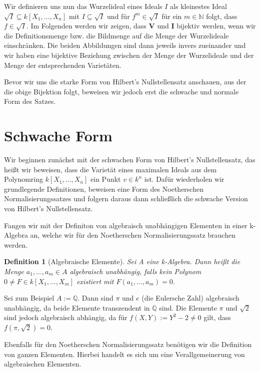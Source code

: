 \documentclass{article}
\newtheorem{definition}[satz]{Definition}
\begin{document}
	Wir definieren uns nun das Wurzelideal eines Ideals \(I\) als kleinestes Ideal \(\sqrt{I} \subseteq k[X_1,\ldots,X_n]\) mit \(I \subseteq \sqrt{I}\) und für \(f^m \in \sqrt{I}\) für ein
	\(m \in \mathbb{N}\) folgt, dass \(f \in \sqrt{I}\). Im Folgenden werden wir zeigen, dass
	\(\mathbf{V}\) und \(\mathbf{I}\) bijektiv werden, wenn wir die Definitionsmenge bzw. die Bildmenge auf die Menge der Wurzelideale einschränken. Die beiden Abbildungen sind dann jeweils 
	invers zueinander und wir haben eine bijektive Beziehung zwischen der Menge der Wurzelideale und
	der Menge der entsprechenden Varietäten.
	
	Bevor wir uns die starke Form von Hilbert's Nullstellensatz anschauen, aus der die obige Bijektion folgt, beweisen wir jedoch erst die schwache und normale Form des Satzes.

\section{Schwache Form}
	Wir beginnen zunächst mit der schwachen Form von Hilbert's Nullstellensatz,
	das heißt wir beweisen, dass die Varietät eines maximalen Ideals aus dem Polynomring \(k[X_1,\ldots,X_n]\) ein Punkt \(v \in k^n\) ist.
	Dafür wiederholen wir grundlegende Definitionen, beweisen eine Form des Noetherschen Normalisierungssatzes und folgern daraus dann schließlich die schwache Version von Hilbert's Nullstellensatz. 
	
	Fangen wir mit der Definiton von algebraisch unabhängigen Elementen in einer
	k-Algebra an, welche wir für den Noetherschen Normalisierungssatz brauchen werden.
	
	\begin{definition}[Algebraische Elemente]
	Sei A eine k-Algebra. Dann heißt die Menge \(a_1,\ldots, a_m \in A\)
	algebraisch unabhängig, falls kein Polynom \(0 \neq F \in k[X_1,\ldots,X_m]
	\) existiert mit \(F(a_1,\ldots,a_m) = 0\).
	\end{definition}

	Sei zum Beispiel \(A:=\mathbb{Q}\). Dann sind \(\pi\) und \(e\) (die Eulersche Zahl) algebraisch unabhängig, da beide Elemente transzendent in \(\mathbb{Q}\) sind. Die Elemente \(\pi\) und \(\sqrt{2}\) sind jedoch algebraisch abhängig, da
	für \(f(X,Y) := Y^2 - 2 \neq 0\) gilt, dass \(f(\pi,\sqrt{2}) = 0\).
	
	Ebenfalls für den Noetherschen Normalisierungssatz benötigen wir die Definition von ganzen Elementen. Hierbei handelt es sich um eine Verallgemeinerung von algebraischen Elementen. \\
\end{document}
